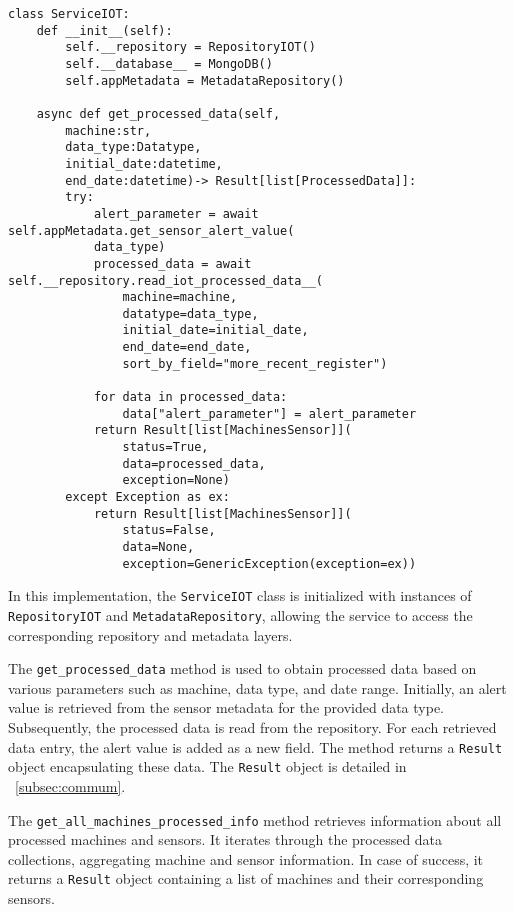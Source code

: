 \begin{verbatim}
class ServiceIOT:
    def __init__(self):
        self.__repository = RepositoryIOT()
        self.__database__ = MongoDB()
        self.appMetadata = MetadataRepository()
            
    async def get_processed_data(self,
        machine:str,
        data_type:Datatype,
        initial_date:datetime,
        end_date:datetime)-> Result[list[ProcessedData]]:
        try:
            alert_parameter = await self.appMetadata.get_sensor_alert_value(
            data_type)
            processed_data = await self.__repository.read_iot_processed_data__(
                machine=machine,
                datatype=data_type,
                initial_date=initial_date,
                end_date=end_date,
                sort_by_field="more_recent_register")
            
            for data in processed_data:
                data["alert_parameter"] = alert_parameter
            return Result[list[MachinesSensor]](
                status=True,
                data=processed_data,
                exception=None)
        except Exception as ex:
            return Result[list[MachinesSensor]](
                status=False,
                data=None,
                exception=GenericException(exception=ex))
\end{verbatim}

In this implementation, the \texttt{ServiceIOT} class is initialized with instances of \texttt{RepositoryIOT} and \texttt{MetadataRepository}, allowing the service to access the corresponding repository and metadata layers.

The \texttt{get\_processed\_data} method is used to obtain processed data based on various parameters such as machine, data type, and date range. Initially, an alert value is retrieved from the sensor metadata for the provided data type. Subsequently, the processed data is read from the repository. For each retrieved data entry, the alert value is added as a new field. The method returns a \texttt{Result} object encapsulating these data. The \texttt{Result} object is detailed in ~\ref{subsec:commum}.

The \texttt{get\_all\_machines\_processed\_info} method retrieves information about all processed machines and sensors. It iterates through the processed data collections, aggregating machine and sensor information. In case of success, it returns a \texttt{Result} object containing a list of machines and their corresponding sensors.


